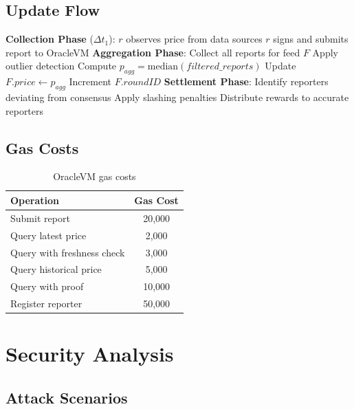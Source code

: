 \documentclass[11pt,a4paper]{article}
\theoremstyle{definition}
\begin{document}
\subsection{Update Flow}

\begin{algorithm}
\caption{Price Update Round}
\begin{algorithmic}[1]
\State \textbf{Collection Phase} ($\Delta t_1$):
    \State $r$ observes price from data sources
    \State $r$ signs and submits report to OracleVM
\EndFor
\State \textbf{Aggregation Phase}:
\State Collect all reports for feed $F$
\State Apply outlier detection
\State Compute $p_{agg} = \text{median}(filtered\_reports)$
\State Update $F.price \gets p_{agg}$
\State Increment $F.roundID$
\State \textbf{Settlement Phase}:
\State Identify reporters deviating from consensus
\State Apply slashing penalties
\State Distribute rewards to accurate reporters
\end{algorithmic}
\end{algorithm}

\subsection{Gas Costs}

\begin{table}[h]
\centering
\begin{tabular}{@{}lc@{}}
\toprule
Operation & Gas Cost \\
\midrule
Submit report & 20,000 \\
Query latest price & 2,000 \\
Query with freshness check & 3,000 \\
Query historical price & 5,000 \\
Query with proof & 10,000 \\
Register reporter & 50,000 \\
\bottomrule
\end{tabular}
\caption{OracleVM gas costs}
\end{table}

\section{Security Analysis}

\subsection{Attack Scenarios}
\end{document}
